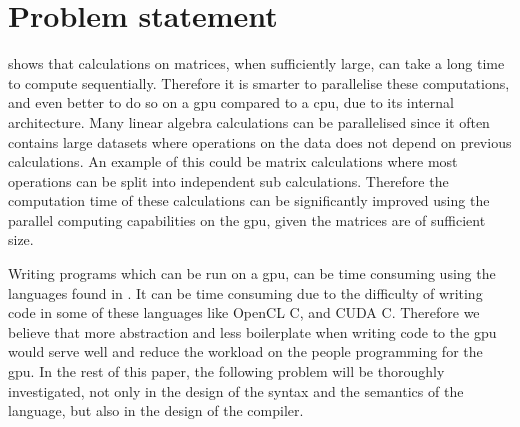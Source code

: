 \newpage
\section{Problem statement}
\label{sec:problem}

 shows that calculations on matrices, when sufficiently large, can take a long time to compute sequentially. 
Therefore it is smarter to parallelise these computations, and even better to do so on a \acrshort{gpu} compared to a \acrshort{cpu}, due to its internal architecture.
Many linear algebra calculations can be parallelised since it often contains large datasets where operations on the data does not depend on previous calculations. 
An example of this could be matrix calculations where most operations can be split into independent sub calculations.
Therefore the computation time of these calculations can be significantly improved using the parallel computing capabilities on the \acrshort{gpu}, given the matrices are of sufficient size.

Writing programs which can be run on a \acrshort{gpu}, can be time consuming using the languages found in .
It can be time consuming due to the difficulty of writing code in some of these languages like OpenCL C, and CUDA C.
Therefore we believe that more abstraction and less boilerplate when writing code to the \acrshort{gpu} would serve well and reduce the workload on the people programming for the \acrshort{gpu}.
In the rest of this paper, the following problem will be thoroughly investigated, not only in the design of the syntax and the semantics of the language, but also in the design of the compiler.

